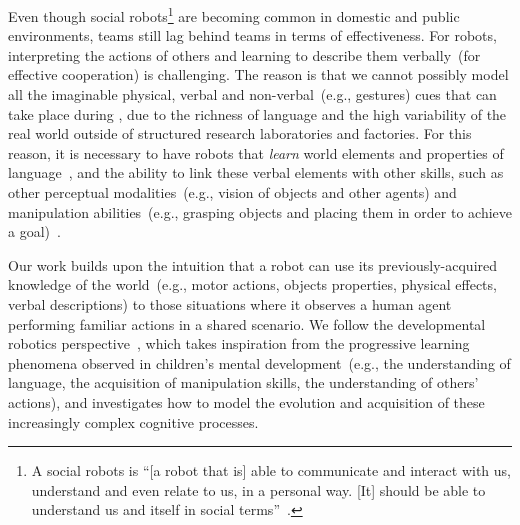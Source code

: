 
Even though social robots\footnote{A social robots is ``[a robot that is] able to communicate and interact with us, understand and even relate to us, in a personal way. [It] should be able to understand us and itself in social terms''~\cite{breazeal:2002:dsr}.} are becoming common in domestic and public environments, \hr{} teams still lag behind \hh{} teams in terms of effectiveness.
For robots, interpreting the actions of others and learning to describe them verbally~(for effective cooperation) is challenging.
The reason is that we cannot possibly model all the imaginable physical, verbal and non-verbal~(e.g., gestures) cues that can take place during \hri, due to the richness of language and the high variability of the real world outside of structured research laboratories and factories.
For this reason, it is necessary to have robots that \emph{learn} world elements and properties of language~\cite{iwahashi:2007:hri}, and the ability to link these verbal elements with other skills, such as other perceptual modalities~(e.g., vision of objects and other agents) and manipulation abilities~(e.g., grasping objects and placing them in order to achieve a goal)~\cite{steels:2003:trendscogsci}.

Our work builds upon the intuition that a robot can use its previously-acquired knowledge of the world~(e.g., motor actions, objects properties, physical effects, verbal descriptions) to those situations where it observes a human agent performing familiar actions in a shared \hr{} scenario.
We follow the developmental robotics perspective~\cite{lungarella:2003:devrobsurvey,cangelosi:2015:devrobbook},
which takes inspiration from the progressive learning phenomena observed in children's mental development~(e.g., the understanding of language, the acquisition of manipulation skills, the understanding of others' actions), and investigates how to model the evolution and acquisition of these increasingly complex cognitive processes.

